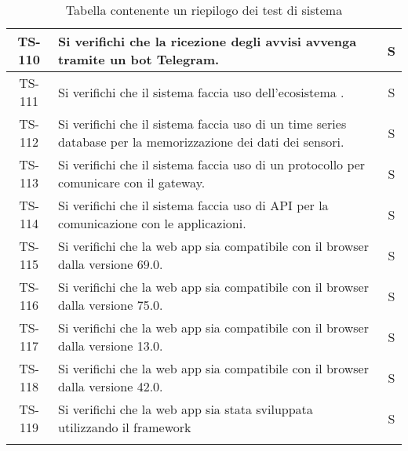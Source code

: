 \begin{center}
\begin{longtable}{|c|p{10cm}|c|}
			 \hline
			 TS-110 & Si verifichi che la ricezione degli avvisi avvenga tramite un bot Telegram. & S \\
			 \hline
			 TS-111 & Si verifichi che il sistema faccia uso dell'ecosistema \glock{Kafka}. & S \\
			 \hline
			 TS-112 & Si verifichi che il sistema faccia uso di un time series database per la memorizzazione dei dati dei sensori. & S \\
			 \hline
			 TS-113 & Si verifichi che il sistema faccia uso di un protocollo per comunicare con il gateway. & S \\
			 \hline
			 TS-114 & Si verifichi che il sistema faccia uso di API per la comunicazione con le applicazioni. & S \\
			 \hline
			 TS-115 & Si verifichi che la web app sia compatibile con il browser \glock{Firefox} dalla versione 69.0. & S \\
			 \hline
			 TS-116 & Si verifichi che la web app sia compatibile con il browser \glock{Chrome} dalla versione 75.0. & S \\
			 \hline
			 TS-117 & Si verifichi che la web app sia compatibile con il browser \glock{Safari} dalla versione 13.0. & S \\
			 \hline
			 TS-118 & Si verifichi che la web app sia compatibile con il browser \glock{Edge} dalla versione 42.0. & S \\
			 \hline
			 TS-119 & Si verifichi che la web app sia stata sviluppata utilizzando il framework \glock{Bootstrap} & S \\
			 \hline

			 \caption{Tabella contenente un riepilogo dei test di sistema}
			\end{longtable}
		\end{center}
		

